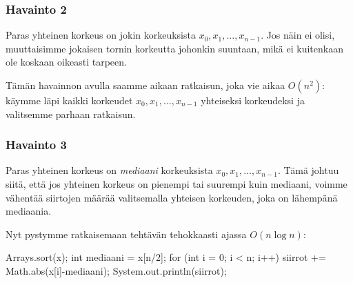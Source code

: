 \subsubsection{Havainto 2}

Paras yhteinen korkeus on jokin korkeuksista $x_0,x_1,\dots,x_{n-1}$.
Jos näin ei olisi, muuttaisimme jokaisen tornin korkeutta
johonkin suuntaan, mikä ei kuitenkaan ole koskaan oikeasti tarpeen.

Tämän havainnon avulla saamme aikaan ratkaisun,
joka vie aikaa $O(n^2)$: käymme läpi kaikki korkeudet
$x_0,x_1,\dots,x_{n-1}$ yhteiseksi korkeudeksi ja valitsemme parhaan ratkaisun.

\subsubsection{Havainto 3}

Paras yhteinen korkeus on \emph{mediaani} korkeuksista
$x_0,x_1,\dots,x_{n-1}$.
Tämä johtuu siitä, että jos yhteinen korkeus on pienempi tai suurempi kuin mediaani,
voimme vähentää siirtojen määrää valitsemalla yhteisen korkeuden,
joka on lähempänä mediaania.

Nyt pystymme ratkaisemaan tehtävän tehokkaasti ajassa $O(n \log n)$:

\begin{code}
Arrays.sort(x);
int mediaani = x[n/2];
for (int i = 0; i < n; i++) {
    siirrot += Math.abs(x[i]-mediaani);
}
System.out.println(siirrot);
\end{code}
